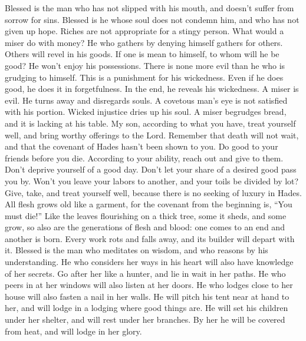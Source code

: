  Blessed is the man who has not slipped with his mouth,
and doesn't suffer from sorrow for sins.  Blessed is he
whose soul does not condemn him, and who has not given up hope.
 Riches are not appropriate for a stingy person. What
would a miser do with money?  He who gathers by denying
himself gathers for others. Others will revel in his goods.
 If one is mean to himself, to whom will he be good? He
won't enjoy his possessions.  There is none more evil than
he who is grudging to himself. This is a punishment for his wickedness.
 Even if he does good, he does it in forgetfulness. In the
end, he reveals his wickedness.  A miser is evil. He turns
away and disregards souls.  A covetous man's eye is not
satisfied with his portion. Wicked injustice dries up his soul.
 A miser begrudges bread, and it is lacking at his table.
 My son, according to what you have, treat yourself well,
and bring worthy offerings to the Lord.  Remember that
death will not wait, and that the covenant of Hades hasn't been shown to
you.  Do good to your friends before you die. According
to your ability, reach out and give to them.  Don't
deprive yourself of a good day. Don't let your share of a desired good
pass you by.  Won't you leave your labors to another, and
your toils be divided by lot?  Give, take, and treat
yourself well, because there is no seeking of luxury in Hades.
 All flesh grows old like a garment, for the covenant
from the beginning is, ``You must die!''  Like the leaves
flourishing on a thick tree, some it sheds, and some grow, so also are
the generations of flesh and blood: one comes to an end and another is
born.  Every work rots and falls away, and its builder
will depart with it.  Blessed is the man who meditates on
wisdom, and who reasons by his understanding.  He who
considers her ways in his heart will also have knowledge of her secrets.
 Go after her like a hunter, and lie in wait in her
paths.  He who peers in at her windows will also listen
at her doors.  He who lodges close to her house will also
fasten a nail in her walls.  He will pitch his tent near
at hand to her, and will lodge in a lodging where good things are.
 He will set his children under her shelter, and will
rest under her branches.  By her he will be covered from
heat, and will lodge in her glory.

